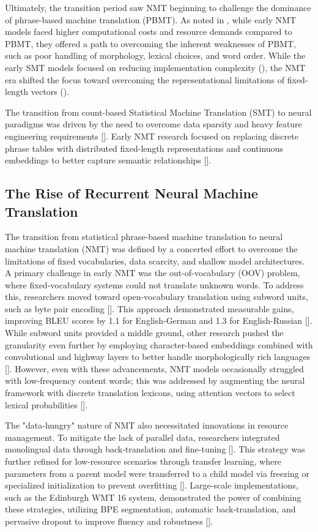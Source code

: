 \documentclass[11pt]{article}
\begin{document}
Ultimately, the transition period saw NMT beginning to challenge the dominance of phrase-based machine translation (PBMT). As noted in \citep{1608.04631}, while early NMT models faced higher computational costs and resource demands compared to PBMT, they offered a path to overcoming the inherent weaknesses of PBMT, such as poor handling of morphology, lexical choices, and word order. While the early SMT models focused on reducing implementation complexity (\citep{cs/0407005}), the NMT era shifted the focus toward overcoming the representational limitations of fixed-length vectors (\citep{1409.0473}).

The transition from count-based Statistical Machine Translation (SMT) to neural paradigms was driven by the need to overcome data sparsity and heavy feature engineering requirements [\citep{1812.04238}]. Early NMT research focused on replacing discrete phrase tables with distributed fixed-length representations and continuous embeddings to better capture semantic relationships [\citep{1912.02047}].
\subsection{The Rise of Recurrent Neural Machine Translation}

The transition from statistical phrase-based machine translation to neural machine translation (NMT) was defined by a concerted effort to overcome the limitations of fixed vocabularies, data scarcity, and shallow model architectures. A primary challenge in early NMT was the out-of-vocabulary (OOV) problem, where fixed-vocabulary systems could not translate unknown words. To address this, researchers moved toward open-vocabulary translation using subword units, such as byte pair encoding [\citep{1508.07909}]. This approach demonstrated measurable gains, improving BLEU scores by 1.1 for English-German and 1.3 for English-Russian [\citep{1508.07909}]. While subword units provided a middle ground, other research pushed the granularity even further by employing character-based embeddings combined with convolutional and highway layers to better handle morphologically rich languages [\citep{1603.00810}]. However, even with these advancements, NMT models occasionally struggled with low-frequency content words; this was addressed by augmenting the neural framework with discrete translation lexicons, using attention vectors to select lexical probabilities [\citep{1606.02006}].

The "data-hungry" nature of NMT also necessitated innovations in resource management. To mitigate the lack of parallel data, researchers integrated monolingual data through back-translation and fine-tuning [\citep{1511.06709}]. This strategy was further refined for low-resource scenarios through transfer learning, where parameters from a parent model were transferred to a child model via freezing or specialized initialization to prevent overfitting [\citep{1604.02201}]. Large-scale implementations, such as the Edinburgh WMT 16 system, demonstrated the power of combining these strategies, utilizing BPE segmentation, automatic back-translation, and pervasive dropout to improve fluency and robustness [\citep{1606.02891}].
\end{document}
